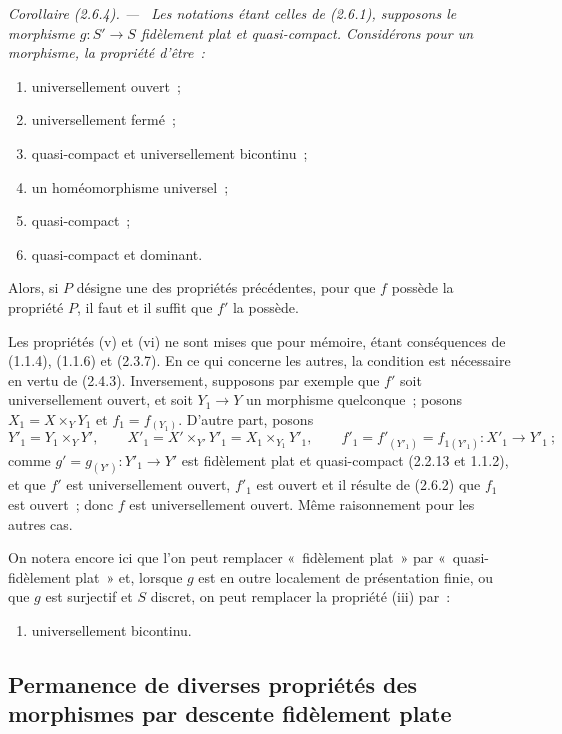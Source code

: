 \documentclass[10pt,oneside]{book}
\newcommand{\oldpage}[2][]{%
  \setcounter{footnote}{0}%
  \marginpar{\scriptsize\textbf{#1}~|~#2}\ignorespaces}
\newenvironment{corollary}[1][]{%
  \par\medskip\noindent\itshape Corollaire (#1). ---\ }{\par}
\begin{document}
\begin{corollary}[2.6.4]
\label{IV.2.6.4-fr}
Les notations étant celles de (2.6.1), supposons le morphisme $g:S'\to S$
fidèlement plat et quasi-compact. Considérons pour un morphisme, la propriété
d'être~:
\begin{enumerate}
\item[(i)] universellement ouvert~;
\item[(ii)] universellement fermé~;
\item[(iii)] quasi-compact et universellement bicontinu~;
\item[(iv)] un homéomorphisme universel~;
\item[(v)] quasi-compact~;
\item[(vi)] quasi-compact et dominant.
\end{enumerate}
Alors, si $P$ désigne une des propriétés précédentes, pour que $f$ possède la
propriété $P$, il faut et il suffit que $f'$ la possède.
\end{corollary}

\oldpage[IV-2]{29}
Les propriétés (v) et (vi) ne sont mises que pour mémoire, étant conséquences
de (1.1.4), (1.1.6) et (2.3.7). En ce qui concerne les autres, la condition
est nécessaire en vertu de (2.4.3). Inversement, supposons par exemple que
$f'$ soit universellement ouvert, et soit $Y_1\to Y$ un morphisme
quelconque~; posons $X_1=X\times_Y Y_1$ et $f_1=f_{(Y_1)}$. D'autre part,
posons
\[
Y'_1=Y_1\times_Y Y',\qquad
X'_1=X'\times_{Y'}Y'_1=X_1\times_{Y_1}Y'_1,
\qquad f'_1=f'_{(Y'_1)}=f_{1(Y'_1)}:X'_1\to Y'_1~;
\]
comme $g'=g_{(Y')}:Y'_1\to Y'$ est fidèlement plat et quasi-compact
(2.2.13 et 1.1.2), et que $f'$ est universellement ouvert, $f'_1$ est ouvert
et il résulte de (2.6.2) que $f_1$ est ouvert~; donc $f$ est universellement
ouvert. Même raisonnement pour les autres cas.

On notera encore ici que l'on peut remplacer «~fidèlement plat~» par
«~quasi-fidèlement plat~» et, lorsque $g$ est en outre localement de
présentation finie, ou que $g$ est surjectif et $S$ discret, on peut remplacer
la propriété (iii) par~:
\begin{enumerate}
\item[(iii \emph{bis})] universellement bicontinu.
\end{enumerate}

\subsection{Permanence de diverses propriétés des morphismes par descente
fidèlement plate}
\label{subsection:IV.2.7-fr}
\end{document}
